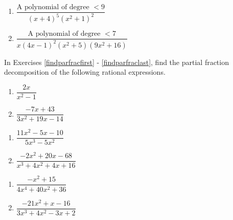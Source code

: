 \begin{multicols}{2}
\begin{enumerate}
\setcounter{enumi}{\value{HW}}

\item $\dfrac{\text{A polynomial of degree } < 9}{(x + 4)^{5}(x^{2} + 1)^{2}}$
\item $\dfrac{\text{A polynomial of degree } < 7}{x(4x - 1)^{2}(x^{2} + 5)(9x^{2} + 16)}$ \label{parfracformlast}

\setcounter{HW}{\value{enumi}}
\end{enumerate}
\end{multicols}


In Exercises \ref{findparfracfirst} - \ref{findparfraclast},  find the partial fraction decomposition of the following rational expressions.

\begin{multicols}{2}
\begin{enumerate}
\setcounter{enumi}{\value{HW}}

\item $\dfrac{2x}{x^{2} - 1}$  \label{findparfracfirst}
\item $\dfrac{-7x + 43}{3x^{2} + 19x - 14}$

\setcounter{HW}{\value{enumi}}
\end{enumerate}
\end{multicols}

\begin{multicols}{2}
\begin{enumerate}
\setcounter{enumi}{\value{HW}}

\item $\dfrac{11x^{2} - 5x - 10}{5x^{3} - 5x^{2}}$
\item $\dfrac{-2x^{2} + 20x - 68}{x^{3} + 4x^{2} + 4x + 16}$

\setcounter{HW}{\value{enumi}}
\end{enumerate}
\end{multicols}

\begin{multicols}{2}
\begin{enumerate}
\setcounter{enumi}{\value{HW}}

\item $\dfrac{-x^{2} + 15}{4x^{4} + 40x^{2} + 36}$
\item $\dfrac{-21x^{2} + x - 16}{3x^{3} + 4x^{2} - 3x + 2}$


\setcounter{HW}{\value{enumi}}
\end{enumerate}
\end{multicols}

